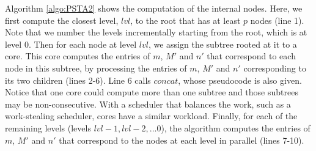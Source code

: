 Algorithm \ref{algo:PSTA2} shows the computation of the internal
nodes.  Here, we first compute the closest level, $lvl$, to the root
that has at least $p$ nodes (line 1).  Note that we number the levels
incrementally starting from the root, which is at level $0$.  Then for
each node at level $lvl$, we assign the subtree rooted at it to a
core.  This core computes the entries of $m$, $M'$ and $n'$ that
correspond to each node in this subtree, by processing the entries of
$m$, $M'$ and $n'$ corresponding to its two children (lines 2-6). Line
6 calls $concat$, whose pseudocode is also given.  Notice that one
core could compute more than one subtree and those subtrees may be
non-consecutive. With a scheduler that balances the work, such as a
work-stealing scheduler, cores have a similar workload.  Finally, for
each of the remaining levels (levels $lvl-1, lvl-2, \ldots 0$), the
algorithm computes the entries of $m$, $M'$ and $n'$ that correspond
to the nodes at each level in parallel (lines 7-10).

